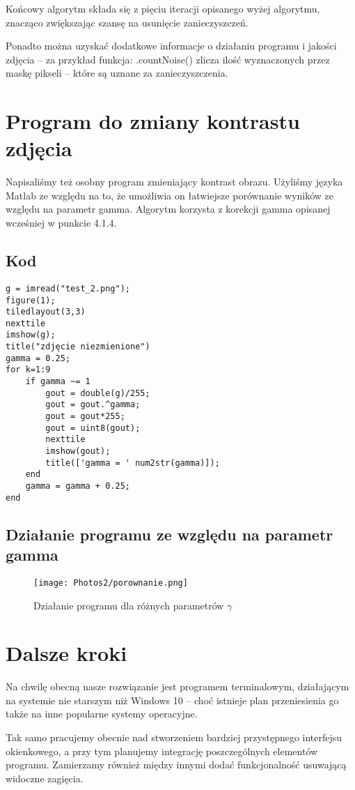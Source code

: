 \documentclass[]{mwart}
\begin{document}
Końcowy algorytm składa się z pięciu iteracji opisanego wyżej algorytmu,
znacząco zwiększając szansę na usunięcie zanieczyszczeń.

Ponadto można uzyskać dodatkowe informacje o działaniu programu
i jakości zdjęcia -- za przykład funkcja: .countNoise()
zlicza ilość wyznaczonych przez maskę pikseli -- które są uznane za zanieczyszczenia.


\section{Program do zmiany kontrastu zdjęcia}
Napisaliśmy też osobny program zmieniający kontrast obrazu.
Użyliśmy języka Matlab ze względu na to, że umożliwia on łatwiejsze porównanie wyników ze względu na parametr gamma.
Algorytm korzysta z korekcji gamma opisanej wcześniej w punkcie 4.1.4.

\subsection{Kod}
\begin{verbatim}
g = imread("test_2.png");
figure(1);
tiledlayout(3,3)
nexttile
imshow(g);
title("zdjęcie niezmienione")
gamma = 0.25;
for k=1:9
    if gamma ~= 1
        gout = double(g)/255;
        gout = gout.^gamma;
        gout = gout*255;
        gout = uint8(gout);
        nexttile
        imshow(gout);
        title(['gamma = ' num2str(gamma)]);
    end
    gamma = gamma + 0.25;
end
\end{verbatim}

\newpage
\subsection{Działanie programu ze względu na parametr gamma}
\begin{figure}[H]
    \centering
    \texttt{[image: Photos2/porownanie.png]}
    \caption{Działanie programu dla różnych parametrów $\gamma$}
\end{figure}


\section{Dalsze kroki}
Na chwilę obecną nasze rozwiązanie jest programem terminalowym,
działającym na systemie nie starszym niż Windows 10 -- choć istnieje
plan przeniesienia go także na inne popularne systemy operacyjne.

Tak samo pracujemy obecnie nad stworzeniem bardziej przystępnego interfejsu okienkowego, a przy tym
planujemy integrację poszczególnych elementów programu. Zamierzamy również między innymi dodać funkcjonalność usuwającą widoczne zagięcia.
\end{document}
